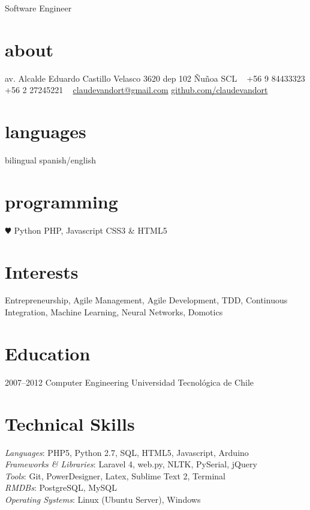 \documentclass[]{friggeri-cv}
\begin{document}
       {Software Engineer}


\begin{aside}
  \section{about}
    av. Alcalde Eduardo
    Castillo Velasco
    3620 dep 102
    Ñuñoa
    SCL
    ~
    +56 9 84433323
    +56 2 27245221
    ~
    \href{mailto:claudevandort@gmail.com}{claudevandort@gmail.com}
    \href{https://github.com/claudevandort}{github.com/claudevandort}
  \section{languages}
    bilingual spanish/english
  \section{programming}
    {\color{red} $\varheartsuit$} Python
    PHP, Javascript
    CSS3 \& HTML5
\end{aside}

\section{Interests}

Entrepreneurship, Agile Management, Agile Development, TDD, Continuous Integration, Machine Learning, Neural Networks, Domotics

\section{Education}

\begin{entrylist}
  \entry
    {2007–2012}
    {Computer Engineering}
    {Universidad Tecnológica de Chile}
    {\emph{}}
\end{entrylist}

\section{Technical Skills}

\emph{Languages}: PHP5, Python 2.7, SQL, HTML5, Javascript, Arduino \\
\emph{Frameworks \& Libraries}: Laravel 4, web.py, NLTK, PySerial, jQuery \\
\emph{Tools}: Git, PowerDesigner, Latex, Sublime Text 2, Terminal \\
\emph{RMDBs}: PostgreSQL, MySQL \\
\emph{Operating Systems}: Linux (Ubuntu Server), Windows \\
\end{document}
